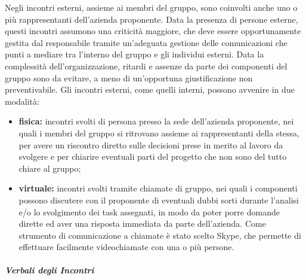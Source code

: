 				Negli incontri esterni, assieme ai membri del gruppo, sono coinvolti anche uno o più rappresentanti dell'azienda proponente.
				\newline
				Data la presenza di persone esterne, questi incontri assumono una criticità maggiore, che deve essere opportunamente gestita dal responsabile tramite un'adeguata gestione delle comunicazioni che punti a mediare tra l'interno del gruppo e gli individui esterni.
				\newline
				Data la complessità dell'organizzazione, ritardi e assenze da parte dei componenti del gruppo sono da evitare, a meno di un'opportuna giustificazione non preventivabile.
				\newline
				Gli incontri esterni, come quelli interni, possono avvenire in due modalità:
				\begin{itemize}
					\item \textbf{fisica:} incontri svolti di persona presso la sede dell'azienda proponente, nei quali i membri del gruppo si ritrovano assieme ai rappresentanti della stessa, per avere un riscontro diretto sulle decisioni prese in merito al lavoro da svolgere e per chiarire eventuali parti del progetto che non sono del tutto chiare al gruppo;
					\item \textbf{virtuale:} incontri svolti tramite chiamate di gruppo, nei quali i componenti possono discutere con il proponente di eventuali dubbi sorti durante l'analisi e/o lo svolgimento dei task assegnati, in modo da poter porre domande dirette ed aver una risposta immediata da parte dell'azienda.
					\newline
					Come strumento di comunicazione a chiamate è stato scelto Skype, che permette di effettuare facilmente videochiamate con una o più persone.
				\end{itemize}
			
			\subparagraph{Verbali degli Incontri}
				
